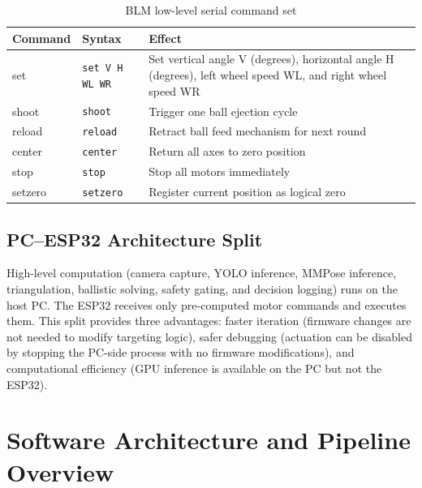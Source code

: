 \begin{table}[htbp]
\caption{BLM low-level serial command set}
\label{tab:3_2}
\centering
\begin{tabularx}{\textwidth}{|l|l|X|}
\hline
\textbf{Command} & \textbf{Syntax} & \textbf{Effect} \\
\hline
set & \texttt{set V H WL WR} & Set vertical angle V (degrees), horizontal angle H (degrees), left wheel speed WL, and right wheel speed WR \\
\hline
shoot & \texttt{shoot} & Trigger one ball ejection cycle \\
\hline
reload & \texttt{reload} & Retract ball feed mechanism for next round \\
\hline
center & \texttt{center} & Return all axes to zero position \\
\hline
stop & \texttt{stop} & Stop all motors immediately \\
\hline
setzero & \texttt{setzero} & Register current position as logical zero \\
\hline
\end{tabularx}
\end{table}

\subsection{PC--ESP32 Architecture Split}

High-level computation (camera capture, YOLO inference, MMPose inference, triangulation, ballistic solving, safety gating, and decision logging) runs on the host PC. The ESP32 receives only pre-computed motor commands and executes them. This split provides three advantages: faster iteration (firmware changes are not needed to modify targeting logic), safer debugging (actuation can be disabled by stopping the PC-side process with no firmware modifications), and computational efficiency (GPU inference is available on the PC but not the ESP32).

\section{Software Architecture and Pipeline Overview}

